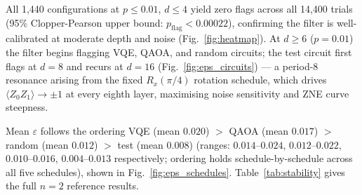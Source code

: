 \documentclass[10pt,letterpaper]{article}
\begin{document}
All 1,440 configurations at $p\leq 0.01$, $d\leq 4$ yield zero flags
across all 14,400 trials (95\% Clopper-Pearson upper bound:
$p_{\mathrm{flag}}<0.00022$), confirming the filter is well-calibrated
at moderate depth and noise (Fig.~\ref{fig:heatmap}). At $d\geq 6$ ($p=0.01$) the filter begins flagging
VQE, QAOA, and random circuits; the test circuit first flags at $d=8$
and recurs at $d=16$ (Fig.~\ref{fig:eps_circuits}) --- a period-8
resonance arising from the fixed $R_x(\pi/4)$ rotation schedule, which
drives $\langle Z_0 Z_1\rangle\to\pm 1$ at every eighth layer,
maximising noise sensitivity and ZNE curve steepness.

Mean $\varepsilon$ follows the ordering
VQE (mean $0.020$) $>$ QAOA (mean $0.017$) $>$
random (mean $0.012$) $>$ test (mean $0.008$)
(ranges: $0.014$--$0.024$, $0.012$--$0.022$, $0.010$--$0.016$,
$0.004$--$0.013$ respectively; ordering holds schedule-by-schedule
across all five schedules),
shown in Fig.~\ref{fig:eps_schedules}.
Table~\ref{tab:stability} gives the full $n=2$ reference results.
\end{document}
